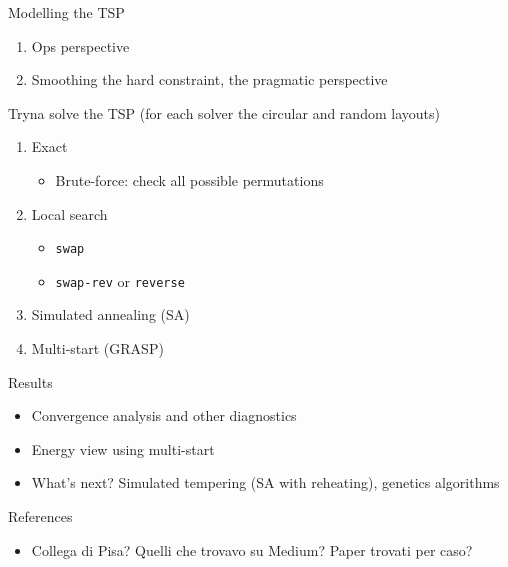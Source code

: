 \documentclass[10pt,a4paper,fleqn]{article}
\theoremstyle{definition}
\newcommand{\inToc}[1]%
	{\addcontentsline{toc}{section}{\texorpdfstring{\protect\numberline{}#1}{#1}}}
\begin{document}
\noindent
Modelling the TSP
\begin{enumerate}
	\item Ops perspective
	\item Smoothing the hard constraint, the pragmatic perspective
\end{enumerate}
Tryna solve the TSP (for each solver the circular and random layouts)
\begin{enumerate}
	\item Exact
	\begin{itemize}
		\item Brute-force: check all possible permutations
	\end{itemize}
	\item Local search
	\begin{itemize}
		\item \texttt{swap}
		\item \texttt{swap-rev} or \texttt{reverse}
	\end{itemize}
	\item Simulated annealing (SA)
	\item Multi-start (GRASP)
\end{enumerate}
Results
\begin{itemize}
	\item Convergence analysis and other diagnostics
	\item Energy view using multi-start
	\item What's next? Simulated tempering (SA with reheating), genetics algorithms
\end{itemize}
References
\begin{itemize}
	\item Collega di Pisa? Quelli che trovavo su Medium? Paper trovati per caso?
\end{itemize}
\cleardoublepage




\end{document}
